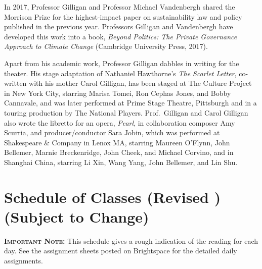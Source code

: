 \documentclass[11pt,twoside]{jgsyllabus}\usepackage[]{graphicx}\usepackage[]{color}
\begin{document}
In 2017, Professor Gilligan and Professor Michael Vandenbergh shared
the Morrison Prize for the highest-impact paper on sustainability law and
policy published in the previous year. Professors Gilligan and Vandenbergh
have developed this work into a book, \emph{Beyond Politics: The Private
Governance Approach to Climate Change\/} (Cambridge University Press, 2017).

Apart from his academic work, Professor Gilligan dabbles in writing for the
theater. His stage adaptation of Nathaniel Hawthorne's \emph{The Scarlet Letter},
co-written with his mother Carol Gilligan, has been staged at The Culture
Project in New York City, starring
Marisa Tomei, Ron Cephas Jones, and Bobby Cannavale, and was later performed
at Prime Stage Theatre, Pittsburgh and in a touring production by The National
Players.
Prof.\ Gilligan and Carol Gilligan also wrote the libretto for an opera,
\emph{Pearl}, in collaboration composer Amy Scurria, and producer/conductor
Sara Jobin, which was performed at Shakespeare \& Company in Lenox MA,
starring Maureen O'Flynn, John Bellemer, Marnie Breckenridge, John Cheek,
and Michael Corvino, and in Shanghai China,
starring Li Xin, Wang Yang, John Bellemer, and Lin Shu.
%
%
%
%
%
%

\clearpage
\cleardoublepage
\appendix
\setcounter{secnumdepth}{0}
\newcommand{\maybehline}{\hline}%
\setlength\extrarowheight{4pt}
\section[Class Schedule]{Schedule of Classes
\ifrevised
	(Revised \RevisionDate)%
\else
	(Subject to Change)%
\fi}

\textbf{\scshape Important Note:} This schedule gives a rough indication of the
reading for each day. See the assignment sheets posted on Brightspace for the
detailed daily assignments.
\end{document}
